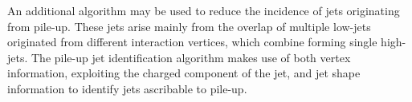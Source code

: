 An additional algorithm may be used to reduce the incidence of jets originating from pile-up. These jets arise mainly from the overlap of multiple low-\pt jets originated from different interaction vertices, which combine forming single high-\pt jets. The pile-up jet identification algorithm makes use of both vertex information, exploiting the charged component of the jet, and jet shape information to identify jets ascribable to pile-up.
